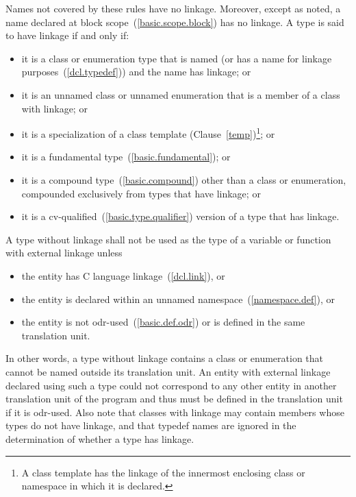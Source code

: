 \pnum
{}%
Names not covered by these rules have no linkage. Moreover, except as
noted, a name declared at block scope~(\ref{basic.scope.block}) has no
linkage. A type is said to have linkage if and only if:
\begin{itemize}
\item it is a class or enumeration type that is named (or has a name for
linkage purposes~(\ref{dcl.typedef})) and the name has linkage; or

\item it is an unnamed class or unnamed enumeration that is a member of a class
with linkage; or

\item it is a specialization of a class template (Clause~\ref{temp})\footnote{A class
template has the linkage of the innermost enclosing class or namespace in which
it is declared.};
or

\item it is a fundamental type~(\ref{basic.fundamental}); or

\item it is a compound type~(\ref{basic.compound}) other than a class or
enumeration, compounded exclusively from types that have linkage; or

\item it is a cv-qualified~(\ref{basic.type.qualifier}) version of a
type that has linkage.
\end{itemize}
A type without linkage shall not be used as the type of a variable or
function with external linkage unless
\begin{itemize}
\item the entity has C language linkage~(\ref{dcl.link}), or

\item the entity is declared within an unnamed
namespace~(\ref{namespace.def}), or

\item the entity is not odr-used~(\ref{basic.def.odr}) or is defined in
the same translation unit.
\end{itemize}
\begin{note}
In other words, a type without linkage contains a class or enumeration that
cannot be named outside its translation unit. An entity with external linkage declared
using such a type could not correspond to any other entity in another translation unit
of the program and thus must be defined in the
translation unit if it is odr-used. Also note that classes with linkage may contain members
whose types do not have linkage, and that typedef names are ignored in the determination
of whether a type has linkage.
\end{note}

